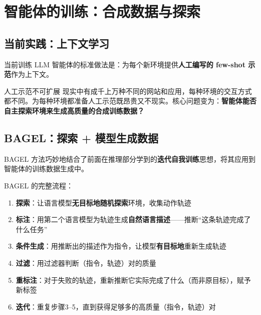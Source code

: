 \documentclass[a4paper]{article}
\begin{document}

\section{智能体的训练：合成数据与探索}

\subsection{当前实践：上下文学习}

当前训练 LLM 智能体的标准做法是：为每个新环境提供\textbf{人工编写的 few-shot 示范}作为上下文。





\begin{warningbox}{人工示范不可扩展}
现实中有成千上万种不同的网站和应用，每种环境的交互方式都不同。为每种环境都准备人工示范既昂贵又不现实。核心问题变为：\textbf{智能体能否自主探索环境来生成高质量的合成训练数据？}
\end{warningbox}

\subsection{BAGEL：探索 + 模型生成数据}

BAGEL 方法巧妙地结合了前面在推理部分学到的\textbf{迭代自我训练}思想，将其应用到智能体的训练数据生成中。





BAGEL 的完整流程：

\begin{enumerate}
    \item \textbf{探索}：让语言模型\textbf{无目标地随机探索}环境，收集动作轨迹
    \item \textbf{标注}：用第二个语言模型为轨迹生成\textbf{自然语言描述}——推断``这条轨迹完成了什么任务''
    \item \textbf{条件生成}：用推断出的描述作为指令，让模型\textbf{有目标地}重新生成轨迹
    \item \textbf{过滤}：用过滤器判断（指令，轨迹）对的质量
    \item \textbf{重标注}：对于失败的轨迹，重新推断它实际完成了什么（而非原目标），赋予新标签
    \item \textbf{迭代}：重复步骤3--5，直到获得足够多的高质量（指令，轨迹）对
\end{enumerate}
\end{document}
